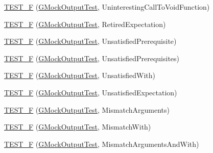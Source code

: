 \begin{DoxyCompactItemize}
\item 
\mbox{\hyperlink{_obj__test_2lib_2googletest-master_2googlemock_2test_2gmock__output__test___8cc_ad6bc4a5b1d635a65363653eff36f6f0c}{T\+E\+S\+T\+\_\+F}} (\mbox{\hyperlink{class_g_mock_output_test}{G\+Mock\+Output\+Test}}, Uninteresting\+Call\+To\+Void\+Function)
\item 
\mbox{\hyperlink{_obj__test_2lib_2googletest-master_2googlemock_2test_2gmock__output__test___8cc_a887f8f9cf09ffea984dcdb87c692c745}{T\+E\+S\+T\+\_\+F}} (\mbox{\hyperlink{class_g_mock_output_test}{G\+Mock\+Output\+Test}}, Retired\+Expectation)
\item 
\mbox{\hyperlink{_obj__test_2lib_2googletest-master_2googlemock_2test_2gmock__output__test___8cc_aab78247f3f1aa1b95feb21150d8e7643}{T\+E\+S\+T\+\_\+F}} (\mbox{\hyperlink{class_g_mock_output_test}{G\+Mock\+Output\+Test}}, Unsatisfied\+Prerequisite)
\item 
\mbox{\hyperlink{_obj__test_2lib_2googletest-master_2googlemock_2test_2gmock__output__test___8cc_aa8df8651de0f2d9f7d1dd765eec89998}{T\+E\+S\+T\+\_\+F}} (\mbox{\hyperlink{class_g_mock_output_test}{G\+Mock\+Output\+Test}}, Unsatisfied\+Prerequisites)
\item 
\mbox{\hyperlink{_obj__test_2lib_2googletest-master_2googlemock_2test_2gmock__output__test___8cc_a3e14c0f9607348fdca074ccc6589fbdd}{T\+E\+S\+T\+\_\+F}} (\mbox{\hyperlink{class_g_mock_output_test}{G\+Mock\+Output\+Test}}, Unsatisfied\+With)
\item 
\mbox{\hyperlink{_obj__test_2lib_2googletest-master_2googlemock_2test_2gmock__output__test___8cc_a662a66a60e7b302feb2dfa4a6b59bf98}{T\+E\+S\+T\+\_\+F}} (\mbox{\hyperlink{class_g_mock_output_test}{G\+Mock\+Output\+Test}}, Unsatisfied\+Expectation)
\item 
\mbox{\hyperlink{_obj__test_2lib_2googletest-master_2googlemock_2test_2gmock__output__test___8cc_a0e3e9858cc7be4771edbe0f346f304f4}{T\+E\+S\+T\+\_\+F}} (\mbox{\hyperlink{class_g_mock_output_test}{G\+Mock\+Output\+Test}}, Mismatch\+Arguments)
\item 
\mbox{\hyperlink{_obj__test_2lib_2googletest-master_2googlemock_2test_2gmock__output__test___8cc_a6e68cce05dc47eea2b0376a1ce4baa23}{T\+E\+S\+T\+\_\+F}} (\mbox{\hyperlink{class_g_mock_output_test}{G\+Mock\+Output\+Test}}, Mismatch\+With)
\item 
\mbox{\hyperlink{_obj__test_2lib_2googletest-master_2googlemock_2test_2gmock__output__test___8cc_a4cea140a4bc751ea563614b827496a96}{T\+E\+S\+T\+\_\+F}} (\mbox{\hyperlink{class_g_mock_output_test}{G\+Mock\+Output\+Test}}, Mismatch\+Arguments\+And\+With)

\end{DoxyCompactItemize}
